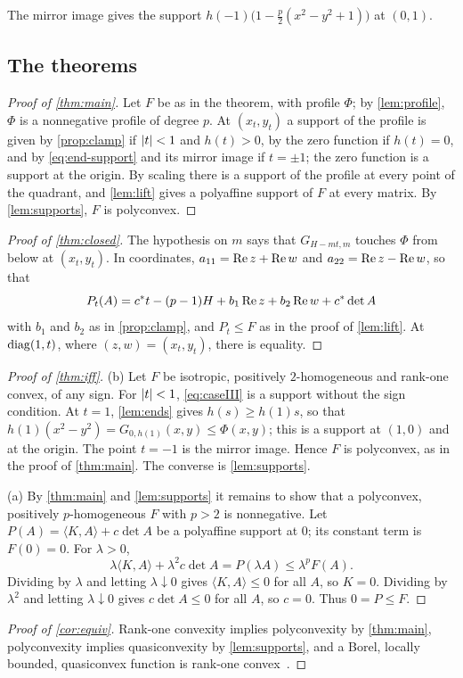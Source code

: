 The mirror image gives the support $h(-1)\bigl(1-\tfrac p2(x^2-y^2+1)\bigr)$ at $(0,1)$.

\subsection{The theorems}

\begin{proof}[Proof of \cref{thm:main}]
Let $F$ be as in the theorem, with profile $\Phi$; by \cref{lem:profile}, $\Phi$ is a
nonnegative profile of degree $p$. At $(x_t,y_t)$ a support of the profile is given by
\cref{prop:clamp} if $\lvert t\rvert<1$ and $h(t)>0$, by the zero function if $h(t)=0$, and by
\eqref{eq:end-support} and its mirror image if $t=\pm1$; the zero function is a support at the
origin. By scaling there is a support of the profile at every point of the quadrant, and
\cref{lem:lift} gives a polyaffine support of $F$ at every matrix. By \cref{lem:supports}, $F$
is polyconvex.
\end{proof}

\begin{proof}[Proof of \cref{thm:closed}]
The hypothesis on $m$ says that $G_{H-mt,m}$ touches $\Phi$ from below at $(x_t,y_t)$. In
coordinates, $a_{11}=\operatorname{Re} z+\operatorname{Re} w$ and $a_{22}=\operatorname{Re} z-\operatorname{Re} w$, so that
\[
  P_t(A)=c^\ast t-(p-1)H+b_1\operatorname{Re} z+b_2\operatorname{Re} w+c^\ast\det A
\]
with $b_1$ and $b_2$ as in \cref{prop:clamp}, and $P_t\le F$ as in the proof of \cref{lem:lift}.
At $\operatorname{diag}(1,t)$, where $(z,w)=(x_t,y_t)$, there is equality.
\end{proof}

\begin{proof}[Proof of \cref{thm:iff}]
(b) Let $F$ be isotropic, positively $2$-homogeneous and rank-one convex, of any sign. For
$\lvert t\rvert<1$, \eqref{eq:caseIII} is a support without the sign condition. At $t=1$,
\cref{lem:ends} gives $h(s)\ge h(1)s$, so that
$h(1)(x^2-y^2)=G_{0,h(1)}(x,y)\le\Phi(x,y)$; this is a support at $(1,0)$ and at the origin. The
point $t=-1$ is the mirror image. Hence $F$ is polyconvex, as in the proof of \cref{thm:main}.
The converse is \cref{lem:supports}.

(a) By \cref{thm:main} and \cref{lem:supports} it remains to show that a polyconvex, positively
$p$-homogeneous $F$ with $p>2$ is nonnegative. Let $P(A)=\langle K,A\rangle+c\det A$ be a
polyaffine support at $0$; its constant term is $F(0)=0$. For $\lambda>0$,
\[
  \lambda\langle K,A\rangle+\lambda^2c\det A=P(\lambda A)\le\lambda^pF(A).
\]
Dividing by $\lambda$ and letting $\lambda\downarrow0$ gives $\langle K,A\rangle\le0$ for all
$A$, so $K=0$. Dividing by $\lambda^2$ and letting $\lambda\downarrow0$ gives $c\det A\le0$ for
all $A$, so $c=0$. Thus $0=P\le F$.
\end{proof}

\begin{proof}[Proof of \cref{cor:equiv}]
Rank-one convexity implies polyconvexity by \cref{thm:main}, polyconvexity implies
quasiconvexity by \cref{lem:supports}, and a Borel, locally bounded, quasiconvex function is
rank-one convex~\cite{Morrey1952,Dacorogna2008}.
\end{proof}
